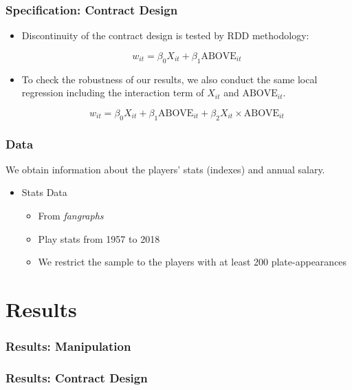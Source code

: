 \documentclass[dvipdfmx,12pt]{beamer}
\begin{document}
\begin{frame}\frametitle{Specification: Contract Design}
  \begin{itemize}
    \item Discontinuity of the contract design is tested by RDD methodology:

    \[
    w_{it} = \beta_0 X_{it} + \beta_1 \text{ABOVE}_{it}
    \]

    \item To check the robustness of our results, we also conduct the same local regression including the interaction term of $X_{it}$ and $\text{ABOVE}_{it}$.

    \[
    w_{it} = \beta_0 X_{it} + \beta_1 \text{ABOVE}_{it} + \beta_2 X_{it} \times \text{ABOVE}_{it}
    \]

  \end{itemize}
\end{frame}

\begin{frame}\frametitle{Data}
  We obtain information about the players' stats (indexes) and annual salary.
  \begin{itemize}
    \item Stats Data
    \begin{itemize}
      \item From \textit{fangraphs}

      \item Play stats from 1957 to 2018

      \item We restrict the sample to the players with at least 200 plate-appearances
    \end{itemize}
  \end{itemize}
\end{frame}

\section{Results}
\begin{frame}\frametitle{Results: Manipulation}

\end{frame}

\begin{frame}\frametitle{}

\end{frame}

\begin{frame}\frametitle{Results: Contract Design}

\end{frame}
\end{document}

